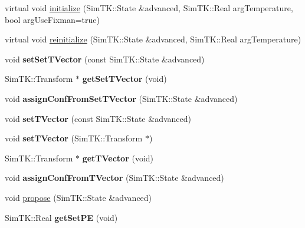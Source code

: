 \begin{DoxyCompactItemize}
\item 
virtual void \hyperlink{classConformationalSearch_af7bf3e9bf537c6636d51fab224ec73d4}{initialize} (Sim\+T\+K\+::\+State \&advanced, Sim\+T\+K\+::\+Real arg\+Temperature, bool arg\+Use\+Fixman=true)
\item 
virtual void \hyperlink{classConformationalSearch_ac9c0b36dfb58b98e376ebbda2fc4bf25}{reinitialize} (Sim\+T\+K\+::\+State \&advanced, Sim\+T\+K\+::\+Real arg\+Temperature)
\item 
void {\bfseries set\+Set\+T\+Vector} (const Sim\+T\+K\+::\+State \&advanced)\hypertarget{classConformationalSearch_a97d594ce806a003f606a78c0fcb49683}{}\label{classConformationalSearch_a97d594ce806a003f606a78c0fcb49683}

\item 
Sim\+T\+K\+::\+Transform $\ast$ {\bfseries get\+Set\+T\+Vector} (void)\hypertarget{classConformationalSearch_a563043f252dcbc1cd27599df7d4dd667}{}\label{classConformationalSearch_a563043f252dcbc1cd27599df7d4dd667}

\item 
void {\bfseries assign\+Conf\+From\+Set\+T\+Vector} (Sim\+T\+K\+::\+State \&advanced)\hypertarget{classConformationalSearch_a83b143b3f3cbc45455c7119767e42f18}{}\label{classConformationalSearch_a83b143b3f3cbc45455c7119767e42f18}

\item 
void {\bfseries set\+T\+Vector} (const Sim\+T\+K\+::\+State \&advanced)\hypertarget{classConformationalSearch_ae7d8679e15ae2b564c56aff7d387e686}{}\label{classConformationalSearch_ae7d8679e15ae2b564c56aff7d387e686}

\item 
void {\bfseries set\+T\+Vector} (Sim\+T\+K\+::\+Transform $\ast$)\hypertarget{classConformationalSearch_ad09b271bc41b4cac94ffcbf253b5afd0}{}\label{classConformationalSearch_ad09b271bc41b4cac94ffcbf253b5afd0}

\item 
Sim\+T\+K\+::\+Transform $\ast$ {\bfseries get\+T\+Vector} (void)\hypertarget{classConformationalSearch_abc47122d4b73e960debbb5902157a299}{}\label{classConformationalSearch_abc47122d4b73e960debbb5902157a299}

\item 
void {\bfseries assign\+Conf\+From\+T\+Vector} (Sim\+T\+K\+::\+State \&advanced)\hypertarget{classConformationalSearch_ab9b4f70f4a4f826a430461403f2d427a}{}\label{classConformationalSearch_ab9b4f70f4a4f826a430461403f2d427a}

\item 
void \hyperlink{classConformationalSearch_a1656b70ede0f43765c9379737d6e6697}{propose} (Sim\+T\+K\+::\+State \&advanced)
\item 
Sim\+T\+K\+::\+Real {\bfseries get\+Set\+PE} (void)\hypertarget{classConformationalSearch_a031616fd5832b60edbb22bc77edeed3d}{}\label{classConformationalSearch_a031616fd5832b60edbb22bc77edeed3d}


\end{DoxyCompactItemize}
